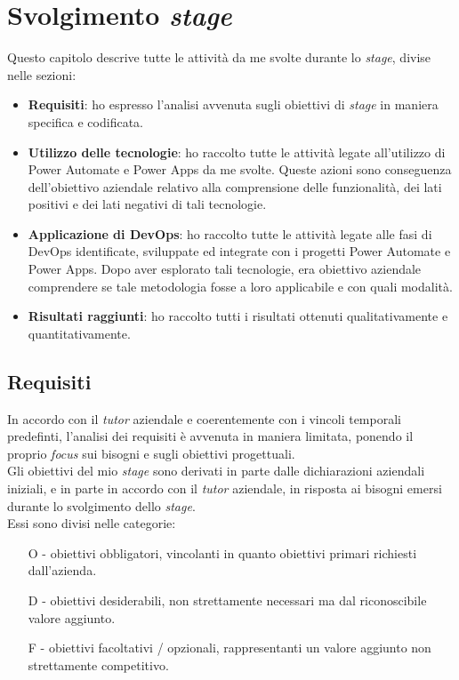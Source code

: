 \chapter{Svolgimento \emph{stage}}
\label{cap:svolgimentoStage}
Questo capitolo descrive tutte le attività da me svolte durante lo \emph{stage}, divise nelle sezioni:
\begin{itemize}
	\item \textbf{Requisiti}: ho espresso l'analisi avvenuta sugli obiettivi di \emph{stage} in maniera specifica e codificata.
    \item \textbf{Utilizzo delle tecnologie}: ho raccolto tutte le attività legate all'utilizzo di Power Automate e Power Apps da me svolte. Queste azioni sono conseguenza dell'obiettivo aziendale relativo alla comprensione delle funzionalità, dei lati positivi e dei lati negativi di tali tecnologie.
    \item \textbf{Applicazione di DevOps}: ho raccolto tutte le attività legate alle fasi di DevOps identificate, sviluppate ed integrate con i progetti Power Automate e Power Apps. Dopo aver esplorato tali tecnologie, era obiettivo aziendale comprendere se tale metodologia fosse a loro applicabile e con quali modalità.
    \item \textbf{Risultati raggiunti}:  ho raccolto tutti i risultati ottenuti qualitativamente e quantitativamente.
\end{itemize}

\section{Requisiti}%
In accordo con il \emph{tutor} aziendale e coerentemente con i vincoli temporali predefinti, l'analisi dei requisiti è avvenuta in maniera limitata, ponendo il proprio \emph{focus} sui bisogni e sugli obiettivi progettuali.\\
Gli obiettivi del mio \emph{stage} sono derivati in parte dalle dichiarazioni aziendali iniziali, e in parte in accordo con il \emph{tutor} aziendale, in risposta ai bisogni emersi durante lo svolgimento dello \emph{stage}.\\
Essi sono divisi nelle categorie:
\begin{enumerate}
	\item[O -]obiettivi obbligatori, vincolanti in quanto obiettivi primari richiesti dall'azienda.
    \item[D -]obiettivi desiderabili, non strettamente necessari ma dal riconoscibile valore aggiunto.
    \item[F -]obiettivi facoltativi / opzionali, rappresentanti un valore aggiunto non strettamente competitivo.
\end{enumerate}

